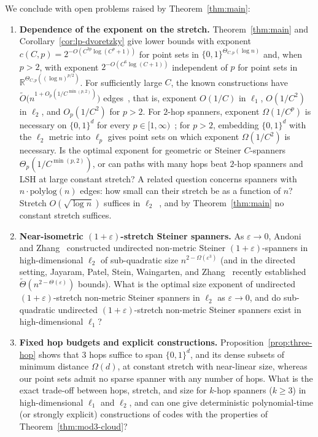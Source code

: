 \documentclass[11pt]{article}
\theoremstyle{definition}
\theoremstyle{remark}
\newcommand{\R}{\mathbb{R}}
\begin{document}
We conclude with open problems raised by Theorem~\ref{thm:main}:
\begin{enumerate}[label=(\arabic*),leftmargin=2em]
  \item \textbf{Dependence of the exponent on the stretch.} Theorem~\ref{thm:main} and Corollary~\ref{cor:lp-dvoretzky} give lower bounds with exponent $c(C, p) = 2^{-O(C^{3p}\log(C^p + 1))}$ for point sets in $\{0, 1\}^{\Theta_{C, p}(\log n)}$ and, when $p > 2$, with exponent $2^{-O(C^6 \log(C + 1))}$ independent of $p$ for point sets in $\R^{\Theta_{C, p}((\log n)^{p/2})}$. For sufficiently large $C$, the known constructions have $\tilde{O}\bigl(n^{1 + O_p(1/C^{\min(p, 2)})}\bigr)$ edges~\cite{althofer1993sparse,harpeled2013euclidean,filtser2022light,krauthgamer2025lipschitz,krauthgamer2025power}, that is, exponent $O(1/C)$ in $\ell_1$, $O(1/C^2)$ in $\ell_2$, and $O_p(1/C^2)$ for $p > 2$. For $2$-hop spanners, exponent $\Omega(1/C^p)$ is necessary on $\{0, 1\}^d$ for every $p \in [1, \infty)$~\cite{harpeled2013euclidean,krauthgamer2026towards}; for $p > 2$, embedding $\{0, 1\}^d$ with the $\ell_2$ metric into $\ell_p$ gives point sets on which exponent $\Omega(1/C^2)$ is necessary. Is the optimal exponent for geometric or Steiner $C$-spanners $\Theta_p(1/C^{\min(p, 2)})$, or can paths with many hops beat $2$-hop spanners and LSH at large constant stretch? A related question concerns spanners with $n \cdot \mathrm{polylog}(n)$ edges: how small can their stretch be as a function of $n$? Stretch $O(\sqrt{\log n})$ suffices in $\ell_2$~\cite{harpeled2013euclidean}, and by Theorem~\ref{thm:main} no constant stretch suffices.
  \item \textbf{Near-isometric $(1 + \varepsilon)$-stretch Steiner spanners.} As $\varepsilon \to 0$, Andoni and Zhang~\cite{andoni2023subquadratic} constructed undirected non-metric Steiner $(1 + \varepsilon)$-spanners in high-dimensional $\ell_2$ of sub-quadratic size $n^{2 - \Omega(\varepsilon^3)}$ (and in the directed setting, Jayaram, Patel, Stein, Waingarten, and Zhang~\cite{jayaram2026near} recently established $\tilde{\Theta}(n^{2 - \Theta(\varepsilon)})$ bounds). What is the optimal size exponent of undirected $(1 + \varepsilon)$-stretch non-metric Steiner spanners in $\ell_2$ as $\varepsilon \to 0$, and do sub-quadratic undirected $(1 + \varepsilon)$-stretch non-metric Steiner spanners exist in high-dimensional $\ell_1$?
  \item \textbf{Fixed hop budgets and explicit constructions.} Proposition~\ref{prop:three-hop} shows that $3$ hops suffice to span $\{0, 1\}^d$, and its dense subsets of minimum distance $\Omega(d)$, at constant stretch with near-linear size, whereas our point sets admit no sparse spanner with any number of hops. What is the exact trade-off between hops, stretch, and size for $k$-hop spanners ($k \ge 3$) in high-dimensional $\ell_1$ and $\ell_2$, and can one give deterministic polynomial-time (or strongly explicit) constructions of codes with the properties of Theorem~\ref{thm:mod3-cloud}?

\end{enumerate}
\end{document}
